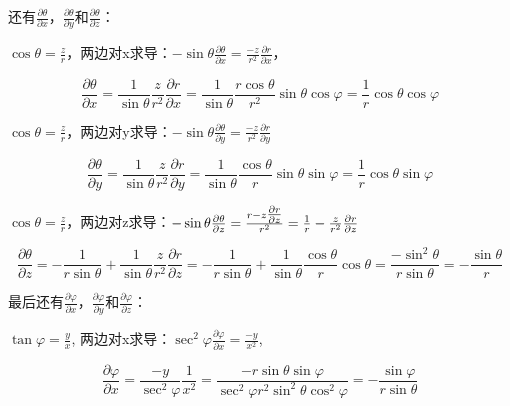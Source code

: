 还有$\frac{\partial \theta}{\partial x}$，$\frac{\partial \theta}{\partial y}$和$\frac{\partial \theta}{\partial z}$： 
 
 $\cos \theta  = \frac{z}{r}$，两边对x求导：$ - \sin \theta \frac{{\partial \theta }}{{\partial x}} = \frac{{ - z}}{{r^2 }}\frac{{\partial r}}{{\partial x}}$，

\begin{equation}
\frac{{\partial \theta }}{{\partial x}} = \frac{1}{{\sin \theta }}\frac{z}{{r^2 }}\frac{{\partial r}}{{\partial x}} = \frac{1}{{\sin \theta }}\frac{{r\cos \theta }}{{r^2 }}\sin \theta \cos \varphi  = \frac{1}{r}\cos \theta \cos \varphi
\end{equation}

$\cos \theta  = \frac{z}{r}$，两边对y求导：$ - \sin \theta \frac{{\partial \theta }}{{\partial y}} = \frac{{ - z}}{{r^2 }}\frac{{\partial r}}{{\partial y}}$

\begin{equation}
\frac{{\partial \theta }}{{\partial y}} = \frac{1}{{\sin \theta }}\frac{z}{{r^2 }}\frac{{\partial r}}{{\partial y}} = \frac{1}{{\sin \theta }}\frac{{\cos \theta }}{r}\sin \theta \sin \varphi  = \frac{1}{r}\cos \theta \sin \varphi
\end{equation}

$\cos \theta  = \frac{z}{r}$，两边对z求导：$ - \sin \theta \frac{{\partial \theta }}{{\partial z}} = \frac{{r - z{\textstyle{{\partial r} \over {\partial z}}}}}{{r^2 }} = \frac{1}{r} - \frac{z}{{r^2 }}\frac{{\partial r}}{{\partial z}}$

\begin{equation}
\frac{{\partial \theta }}{{\partial z}} =  - \frac{1}{{r\sin \theta }} + \frac{1}{{\sin \theta }}\frac{z}{{r^2 }}\frac{{\partial r}}{{\partial z}} =  - \frac{1}{{r\sin \theta }} + \frac{1}{{\sin \theta }}\frac{{\cos \theta }}{r}\cos \theta  = \frac{{ - \sin ^2 \theta }}{{r\sin \theta }} =  - \frac{{\sin \theta }}{r}
\end{equation}

最后还有$\frac{\partial \varphi}{\partial x}$，$\frac{\partial \varphi}{\partial y}$和$\frac{\partial \varphi}{\partial z}$：

$\tan \varphi  = \frac{y}{x}$, 两边对x求导：$\sec ^2 \varphi \frac{{\partial \varphi }}{{\partial x}} = \frac{{ - y}}{{x^2 }}$,

\begin{equation}
\frac{{\partial \varphi }}{{\partial x}} = \frac{{ - y}}{{\sec ^2 \varphi }}\frac{1}{{x^2 }} = \frac{{ - r\sin \theta \sin \varphi }}{{\sec ^2 \varphi r^2 \sin ^2 \theta \cos ^2 \varphi }} =  - \frac{{\sin \varphi }}{{r\sin \theta }}
\end{equation}

